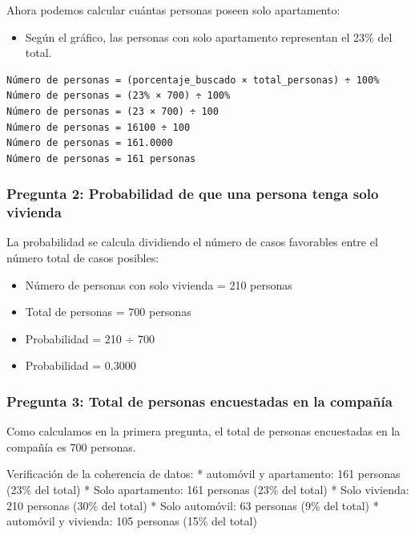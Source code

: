 \documentclass[
]{article}
\providecommand{\tightlist}{%
  \setlength{\itemsep}{0pt}\setlength{\parskip}{0pt}}
\begin{document}
Ahora podemos calcular cuántas personas poseen solo apartamento:

\begin{itemize}
\tightlist
\item
  Según el gráfico, las personas con solo apartamento representan el
  23\% del total.
\end{itemize}

\begin{verbatim}
Número de personas = (porcentaje_buscado × total_personas) ÷ 100%
Número de personas = (23% × 700) ÷ 100%
Número de personas = (23 × 700) ÷ 100
Número de personas = 16100 ÷ 100
Número de personas = 161.0000
Número de personas = 161 personas
\end{verbatim}

\subsubsection{Pregunta 2: Probabilidad de que una persona tenga solo
vivienda}\label{pregunta-2-probabilidad-de-que-una-persona-tenga-solo-vivienda}

La probabilidad se calcula dividiendo el número de casos favorables
entre el número total de casos posibles:

\begin{itemize}
\tightlist
\item
  Número de personas con solo vivienda = 210 personas
\item
  Total de personas = 700 personas
\item
  Probabilidad = 210 ÷ 700
\item
  Probabilidad = 0.3000
\end{itemize}

\subsubsection{Pregunta 3: Total de personas encuestadas en la
compañía}\label{pregunta-3-total-de-personas-encuestadas-en-la-compauxf1uxeda}

Como calculamos en la primera pregunta, el total de personas encuestadas
en la compañía es 700 personas.

Verificación de la coherencia de datos: * automóvil y apartamento: 161
personas (23\% del total) * Solo apartamento: 161 personas (23\% del
total) * Solo vivienda: 210 personas (30\% del total) * Solo automóvil:
63 personas (9\% del total) * automóvil y vivienda: 105 personas (15\%
del total)
\end{document}
